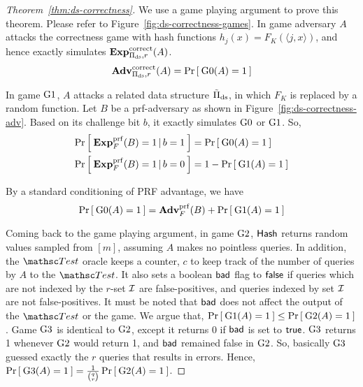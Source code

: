 \newcommand{\FK}{F_K(\langle j,x \rangle)}
\newcommand{\rhoK}{\rho(\langle j,x \rangle)}
\newcommand{\OK}{\calO(\langle j,x \rangle)}

\begin{proof}[Theorem~\ref{thm:ds-correctness}]
We use a game playing argument to prove this theorem. Please refer to
Figure~\ref{fig:ds-correctness-games}. In game  adversary $A$ attacks the correctness game with  hash functions $h_j(x) = \FK $, and hence exactly simulates $\mathrm{\mathbf{Exp}}^{\mathrm{correct}}_{\Pi_{\mathrm{ds}},r}(A)$.
\begin{equation}
\mathrm{\mathbf{Adv}}^{\mathrm{correct}}_{\Pi_{\mathrm{ds}},r}(A) = \Pr\left[\: \text{G0}(A)=1 \:\right]
\end{equation}

In game $\text{G1}$, $A$ attacks a related data structure $\tilde{\Pi}_\mathrm{ds}$, in which $F_K$ is replaced by a random function. Let $B$ be a prf-adversary as shown in Figure~\ref{fig:ds-correctness-adv}. Based on its challenge bit $b$, it exactly simulates $\text{G0}$ or $\text{G1}$. So,
\begin{align*}
\Pr\left[\: \mathbf{Exp}^{\mathrm{prf}}_{F}(B) = 1\,|\,b=1 \:\right] &= \Pr\left[\: \text{G0}(A)=1 \:\right] \\
\Pr\left[\: \mathbf{Exp}^{\mathrm{prf}}_{F}(B) = 1\,|\,b=0 \:\right] &= 1-\Pr\left[\: \text{G1}(A)=1 \:\right]
\end{align*}

By a standard conditioning of PRF advantage, we have
\begin{equation*}
\Prob{\game{0}(A)=1} = \AdvPRF{F}{B} + \Prob{\game{1}(A)=1}%
\end{equation*}

Coming back to the game playing argument, in game $\text{G2}$, $\mathsf{Hash}$ returns random values sampled from $[m]$, assuming $A$ makes no pointless queries. In addition, the $\Test$ oracle keeps a counter, $c$ to keep track of the number of queries by $A$ to the $\Test$. It also sets a boolean $\mathsf{bad}$ flag to $\mathsf{false}$ if queries which are not indexed by the $r$-set ${\cal I}$ are false-positives, and queries indexed by set ${\cal I}$ are not false-positives. It must be noted that $\mathsf{bad}$ does not affect the output of the $\Test$ or the game. We argue that, $\Pr\left[\: \text{G1}(A)=1 \:\right] \leq \Pr\left[\: \text{G2}(A)=1 \:\right]$. Game $\text{G3}$ is identical to $\text{G2}$, except it returns 0 if $\mathsf{bad}$ is set to $\mathsf{true}$. $\text{G3}$ returns 1 whenever $\text{G2}$ would return 1, and $\mathsf{bad}$ remained false in $\text{G2}$. So, basically $\text{G3}$ guessed exactly the $r$ queries that results in errors. Hence, $\Pr\left[\: \text{G3}(A)=1 \:\right] = \frac{1}{\binom{q}{r}}\Pr\left[\: \text{G2}(A)=1 \:\right]$.


\end{proof}
